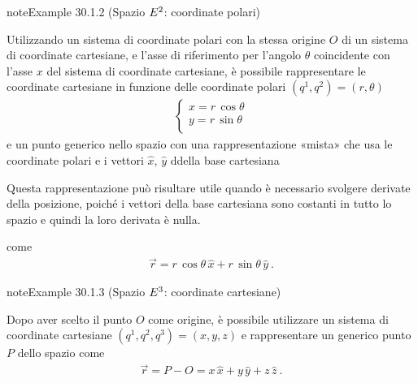 \documentclass[letterpaper,10pt,italian]{jupyterBook}
\begin{document}
\begin{sphinxadmonition}{note}{Example 30.1.2 (Spazio \protect\(E^2\protect\): coordinate polari)}



\sphinxAtStartPar
Utilizzando un sistema di coordinate polari con la stessa origine \(O\) di un sistema di coordinate cartesiane, e l’asse di riferimento per l’angolo \(\theta\) coincidente con l’asse \(x\) del sistema di coordinate cartesiane, è possibile rappresentare le coordinate cartesiane in funzione delle coordinate polari \((q^1, q^2) = (r, \theta)\)
\begin{equation*}
\begin{split}\begin{cases}
  x = r \, \cos \theta \\
  y = r \, \sin \theta \\
\end{cases}\end{split}
\end{equation*}
\sphinxAtStartPar
e un punto generico nello spazio \sphinxhyphen{} con una rappresentazione «mista» che usa le coordinate polari e i vettori \(\hat{x}\), \(\hat{y}\) ddella base cartesiana%
\begin{footnote}[1]\sphinxAtStartFootnote
Questa rappresentazione può risultare utile quando è necessario svolgere derivate della posizione, poiché i vettori della base cartesiana sono costanti in tutto lo spazio e quindi la loro derivata è nulla.  
%
\end{footnote} \sphinxhyphen{} come
\begin{equation*}
\begin{split}\vec{r} = r \, \cos \theta \, \hat{x} + r \, \sin \theta \, \hat{y} \ .\end{split}
\end{equation*}\end{sphinxadmonition}
\label{ch/vector-calculus/geometry:def-cartesinan-coords-e3}
\begin{sphinxadmonition}{note}{Example 30.1.3 (Spazio \protect\(E^3\protect\): coordinate cartesiane)}



\sphinxAtStartPar
Dopo aver scelto il punto \(O\) come origine, è possibile utilizzare un sistema di coordinate cartesiane \((q^1, q^2, q^3) = (x,y,z)\) e rappresentare un generico punto \(P\) dello spazio come
\begin{equation*}
\begin{split}\vec{r} = P - O = x \, \hat{x} + y \, \hat{y} + z \, \hat{z} \ .\end{split}
\end{equation*}\end{sphinxadmonition}
\end{document}

